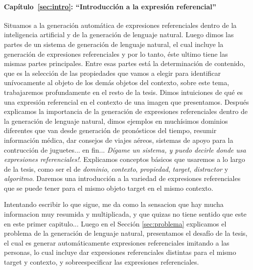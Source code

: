 \paragraph{Cap\'itulo~\ref{sec:intro}: ``Introducci\'on a la expresi\'on referencial''} Situamos a la generaci\'on autom\'atica de expresiones 
referenciales dentro de la inteligencia artificial y de la generaci\'on de lenguaje natural. Luego dimos las partes de un sistema de 
generaci\'on de lenguaje natural, el cual incluye la generaci\'on de expresiones referenciales y por lo tanto, \'este ultimo tiene las mismas 
partes principales. Entre esas partes est\'a la determinaci\'on de contenido, que es la selecci\'on de las propiedades que vamos a elegir 
para identificar un\'ivocamente al objeto de los dem\'as objetos del contexto, sobre este tema, trabajaremos profundamente en el resto de la 
tesis. Dimos intuiciones de qu\'e es una expresi\'on referencial en el contexto de una imagen que presentamos. Despu\'es explicamos la 
importancia de la generaci\'on de expresiones referenciales dentro de la generaci\'on de lenguaje natural, dimos ejemplos en much\'isimos 
dominios diferentes que van desde generaci\'on de pron\'osticos del tiempo, resumir informaci\'on m\'edica, dar consejos de viajes a\'ereos, 
sistemas de apoyo para la contrucci\'on de juguetes... en fin... {\it D\'igame un sistema, y puedo decirle donde usa expresiones 
referenciales!}. Explicamos conceptos b\'asicos que usaremos a lo largo de la tesis, como ser el de {\it dominio}, {\it contexto}, 
{\it propiedad}, {\it target}, {\it distractor} y {\it algoritmo}. Daremos una introducci\'on a la variedad de expresiones referenciales que 
se puede tener para el mismo objeto target en el mismo contexto.

Intentando escribir lo que sigue, me da como la sensacion que hay mucha informacion muy resumida y multiplicada, y que quizas no tiene sentido
 que este en este primer capitulo...
Luego en el Secci\'on \ref{sec:problema} explicamos el problema de la generaci\'on de lenguaje natural, presentamos el desaf\'io de la tesis,
 el cual es generar autom\'aticamente expresiones referenciales imitando a las personas, lo cual incluye dar expresiones referenciales 
distintas para el mismo target y contexto, y sobreespecificar las expresiones referenciales. 

